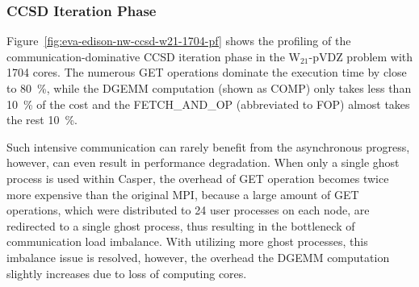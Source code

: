 \subsubsection{CCSD Iteration Phase}

Figure~\ref{fig:eva-edison-nw-ccsd-w21-1704-pf} shows the profiling of
the communication-dominative CCSD iteration phase in the W$_{21}$-pVDZ
problem with 1704 cores. The numerous GET operations dominate the execution
time by close to 80~\%, while the DGEMM computation (shown as COMP) only
takes less than 10~\% of the cost and the FETCH\_AND\_OP (abbreviated to FOP)
almost takes the rest 10~\%.

Such intensive communication can rarely benefit from the asynchronous
progress, however, can even result in performance degradation.
When only a single ghost process is used within Casper, the overhead of
GET operation becomes twice more expensive than the original MPI,
because a large amount of GET operations, which were distributed to 24
user processes on each node, are redirected to a single ghost process,
thus resulting in the bottleneck of communication load imbalance. With
utilizing more ghost processes, this imbalance issue is resolved, however,
the overhead the DGEMM computation slightly increases due to loss of
computing cores.

